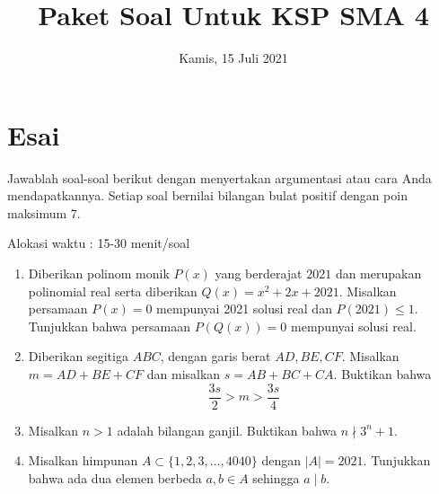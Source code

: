 \documentclass{article}
\title{Paket Soal Untuk KSP SMA 4}
\date{Kamis, 15 Juli 2021}
\begin{document}
	\maketitle

\section{Esai}
Jawablah soal-soal berikut dengan menyertakan argumentasi atau cara Anda mendapatkannya. Setiap soal bernilai bilangan bulat positif dengan poin maksimum 7.

Alokasi waktu : 15-30 menit/soal

\begin{enumerate}[resume]
	\item Diberikan polinom monik $P(x)$ yang berderajat $2021$ dan merupakan polinomial real serta diberikan
	$Q(x)=x^2+2x+2021$. Misalkan persamaan $P(x)=0$ mempunyai 2021 solusi real
	dan $P(2021) \le 1$. Tunjukkan bahwa persamaan $P(Q(x))=0$ mempunyai solusi real. 
	
	\item Diberikan segitiga $ABC$, dengan garis berat $AD, BE, CF$. Misalkan $m=AD+BE+CF$ dan misalkan $s=AB+BC+CA$. Buktikan bahwa $$\dfrac{3s}{2} > m > \dfrac{3s}{4}$$
	
	\item Misalkan $n > 1$ adalah bilangan ganjil. Buktikan bahwa $n \nmid 3^n + 1$.
	
	\item Misalkan himpunan $A \subset \{1,2,3,\dots,4040\}$ dengan $|A| = 2021$. Tunjukkan bahwa ada dua elemen berbeda $a,b \in A$ sehingga $a \mid b$.
\end{enumerate}
\end{document}
